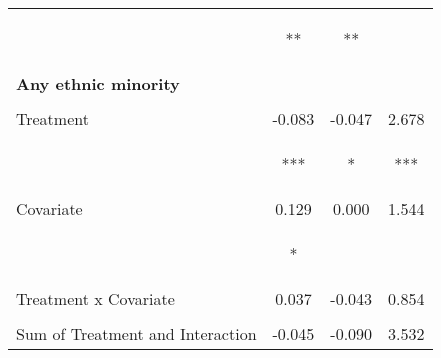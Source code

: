 \begin{tabular}{lccc}
 & \begin{footnotesize}[0.040]**\end{footnotesize} & \begin{footnotesize}[0.035]**\end{footnotesize} & \begin{footnotesize}[1.288]\end{footnotesize}\\
\noalign{\smallskip}\textbf{Any ethnic minority} &  &  & \\
 & \begin{footnotesize}\end{footnotesize} & \begin{footnotesize}\end{footnotesize} & \begin{footnotesize}\end{footnotesize}\\
\noalign{\smallskip}Treatment & -0.083 & -0.047 & 2.678\\
 & \begin{footnotesize}[0.032]***\end{footnotesize} & \begin{footnotesize}[0.028]*\end{footnotesize} & \begin{footnotesize}[1.010]***\end{footnotesize}\\
\noalign{\smallskip}Covariate & 0.129 & 0.000 & 1.544\\
 & \begin{footnotesize}[0.073]*\end{footnotesize} & \begin{footnotesize}[0.000]\end{footnotesize} & \begin{footnotesize}[2.754]\end{footnotesize}\\
\noalign{\smallskip}Treatment x Covariate & 0.037 & -0.043 & 0.854\\
 & \begin{footnotesize}[0.080]\end{footnotesize} & \begin{footnotesize}[0.071]\end{footnotesize} & \begin{footnotesize}[2.853]\end{footnotesize}\\
\noalign{\smallskip}Sum of Treatment and Interaction & -0.045 & -0.090 & 3.532\\

\end{tabular}
